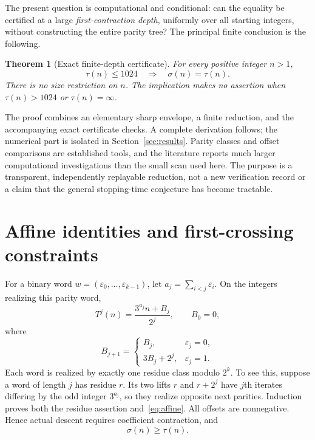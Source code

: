 \documentclass[11pt,a4paper]{amsart}
\newtheorem{theorem}{Theorem}[section]
\theoremstyle{definition}
\theoremstyle{remark}
\begin{document}
The present question is computational and conditional: can the equality
be certified at a large \emph{first-contraction depth}, uniformly over
all starting integers, without constructing the entire parity tree?
The principal finite conclusion is the following.

\begin{theorem}[Exact finite-depth certificate]\label{thm:main}
For every positive integer $n>1$,
\[
\tau(n)\le1024\quad\Longrightarrow\quad\sigma(n)=\tau(n).
\]
There is no size restriction on $n$. The implication makes no assertion
when $\tau(n)>1024$ or $\tau(n)=\infty$.
\end{theorem}

The proof combines an elementary sharp envelope, a finite reduction, and
the accompanying exact certificate checks. A complete derivation follows;
the numerical part is isolated in Section~\ref{sec:results}.
Parity classes and offset comparisons are established tools, and the
literature reports much larger computational investigations than the
small scan used here. The purpose is a transparent, independently
replayable reduction, not a new verification record or a claim that the
general stopping-time conjecture has become tractable.

\section{Affine identities and first-crossing constraints}
For a binary word $w=(\varepsilon_0,\ldots,\varepsilon_{k-1})$, let
$a_j=\sum_{i<j}\varepsilon_i$. On the integers realizing this parity word,
\begin{equation}\label{eq:affine}
T^j(n)=\frac{3^{a_j}n+B_j}{2^j},\qquad B_0=0,
\end{equation}
where
\begin{equation}\label{eq:B}
B_{j+1}=\begin{cases}B_j,&\varepsilon_j=0,\\
3B_j+2^j,&\varepsilon_j=1.\end{cases}
\end{equation}
Each word is realized by exactly one residue class modulo $2^k$.
To see this, suppose a word of length $j$ has residue $r$.
Its two lifts $r$ and $r+2^j$ have $j$th iterates differing by the odd
integer $3^{a_j}$, so they realize opposite next parities. Induction
proves both the residue assertion and~\eqref{eq:affine}.
All offsets are nonnegative. Hence actual descent requires coefficient
contraction, and
\begin{equation}\label{eq:order}
\sigma(n)\ge\tau(n).
\end{equation}
\end{document}
